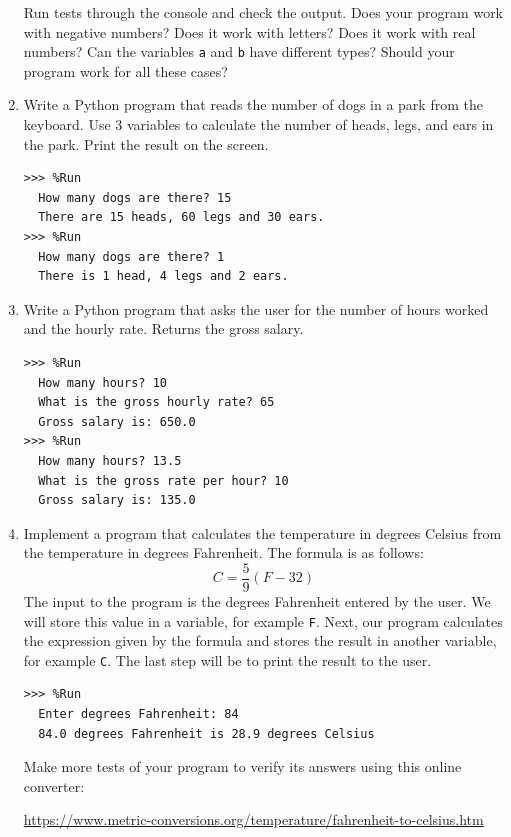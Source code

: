 \begin{enumerate}
Run tests through the console and check the output. Does your program work with negative numbers? Does it work with letters? Does it work with real numbers? Can the variables \verb+a+ and \verb+b+ have different types? Should your program work for all these cases?




\item Write a Python program that reads the number of dogs in a park from the keyboard. Use 3 variables to calculate the number of heads, legs, and ears in the park. Print the result on the screen.

\begin{Verbatim}[frame=single, label={\em examples and possible execution tests}]
>>> %Run
  How many dogs are there? 15
  There are 15 heads, 60 legs and 30 ears.
>>> %Run
  How many dogs are there? 1
  There is 1 head, 4 legs and 2 ears.
\end{Verbatim}


\item Write a Python program that asks the user for the number of hours worked and the hourly rate. Returns the gross salary.

\begin{Verbatim}[frame=single, label={\em examples and possible execution tests}]
>>> %Run
  How many hours? 10
  What is the gross hourly rate? 65
  Gross salary is: 650.0
>>> %Run
  How many hours? 13.5
  What is the gross rate per hour? 10
  Gross salary is: 135.0
\end{Verbatim}

\item Implement a program that calculates the temperature in degrees Celsius from the temperature in degrees Fahrenheit. The formula is as follows:
\begin{displaymath}
  C = \frac{5}{9}(F-32)
\end{displaymath} 
The input to the program is the degrees Fahrenheit entered by the user. We will store this value in a variable, for example \verb+F+. Next, our program calculates the expression given by the formula and stores the result in another variable, for example \verb+C+. The last step will be to print the result to the user.

\begin{Verbatim}[frame=single, label={\em example of execution}]
>>> %Run 
  Enter degrees Fahrenheit: 84
  84.0 degrees Fahrenheit is 28.9 degrees Celsius
\end{Verbatim}

Make more tests of your program to verify its answers using this online converter:

\url{https://www.metric-conversions.org/temperature/fahrenheit-to-celsius.htm}


\end{enumerate}

